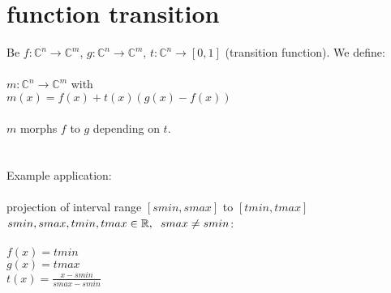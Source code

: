 \documentclass[a4paper]{article}
\newcommand{\spc}{\hspace{0.2cm}}
\begin{document}
\section{function transition}
Be $f:\mathbb{C}^n\rightarrow\mathbb{C}^m$, $g:\mathbb{C}^n\rightarrow\mathbb{C}^m$, $t:\mathbb{C}^n\rightarrow[0,1]$ (transition function). We define:\\\\
$m:\mathbb{C}^n\rightarrow\mathbb{C}^m$ with\\
$m(x)=f(x)+t(x)(g(x)-f(x))$
\\\\
$m$ morphs $f$ to $g$ depending on $t$.\\\\\\
Example application:\\\\
projection of interval range $[smin,smax]$ to $[tmin,tmax]$\\
$smin,smax,tmin,tmax\in\mathbb{R},\spc smax\not=smin$:\\\\
$f(x)=tmin$\\
$g(x)=tmax$\\
$t(x)=\frac{x-smin}{smax-smin}$
\end{document}
